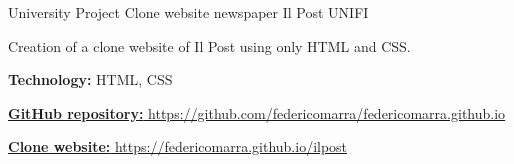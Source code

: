 \begin{cventries}
\begin{comment}
  \cventry
    {University Project} %
    {Timer, clock and chronometer C++ app} %
    {UNIFI} %
    {} %
    {
      \begin{cvitems} %
        \item {C++ realization of a terminal executable app that works as a timer, clock and stopwatch using the Ncurses library.}
        \item {\textbf{Technology:} C++, Ncurses}
        \item {\href{https://github.com/federicomarra/timer-clock-chronometer}{\textbf{GitHub repository:} https://github.com/federicomarra/timer-clock-chronometer}}
      \end{cvitems}
    }
\end{comment}

  \cventry
    {University Project} %
    {Clone website newspaper Il Post} %
    {UNIFI} %
    {} %
    {
      \begin{cvitems} %
        \item {Creation of a clone website of Il Post using only HTML and CSS.}
        \item {\textbf{Technology:} HTML, CSS}
        \item {\href{https://github.com/federicomarra/federicomarra.github.io}{\textbf{GitHub repository:} https://github.com/federicomarra/federicomarra.github.io}}
        \item {\href{https://federicomarra.github.io/ilpost/}{\textbf{Clone website:} https://federicomarra.github.io/ilpost}}
      \end{cvitems}
    }


\end{cventries}
